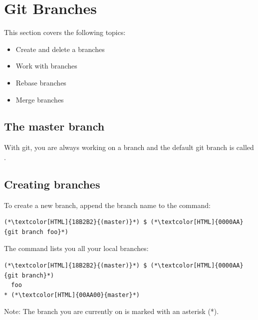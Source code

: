 \section{Git Branches}
\begin{frame}[fragile]
  \slidetitle

  This section covers the following topics:
  \begin{itemize}
    \pause
    \item Create and delete a branches
    \pause
    \item Work with branches
    \pause
    \item Rebase branches
    \pause
    \item Merge branches
  \end{itemize}
\end{frame}

\subsection{The master branch}
\begin{frame}[fragile]
  \subslidetitle

  With git, you are always working on a branch and the default git branch is called .

\end{frame}

\subsection{Creating branches}
\begin{frame}[fragile]
  \subslidetitle

  To create a new  branch, append the branch name to the  command:
  \begin{lstlisting}
(*\textcolor[HTML]{18B2B2}{(master)}*) $ (*\textcolor[HTML]{0000AA}{git branch foo}*)
\end{lstlisting}

  The  command lists you all your local branches:
  \begin{lstlisting}
(*\textcolor[HTML]{18B2B2}{(master)}*) $ (*\textcolor[HTML]{0000AA}{git branch}*)
  foo
* (*\textcolor[HTML]{00AA00}{master}*)
\end{lstlisting}

Note: The branch you are currently on is marked with an asterisk (*).
\end{frame}

